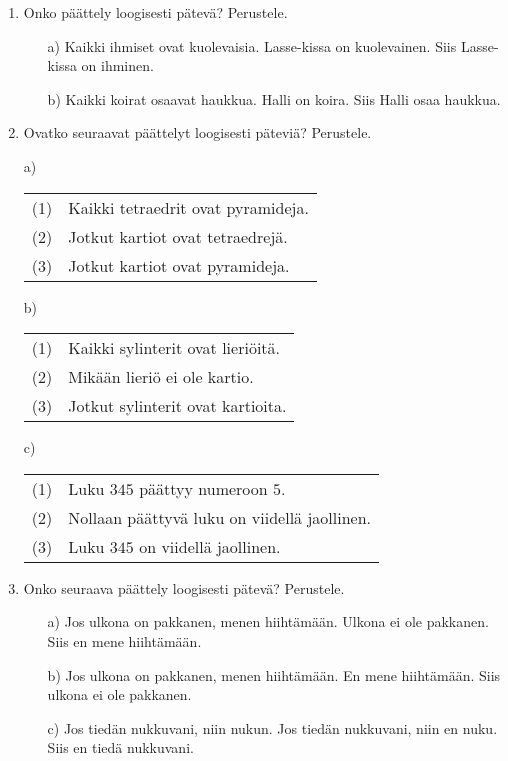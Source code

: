  

\Harjoitustehtavat

\begin{enumerate}

\item Onko päättely loogisesti pätevä? Perustele.
\begin{itemize}
\item[a)]
Kaikki ihmiset ovat kuolevaisia. Lasse-kissa on kuolevainen. Siis Lasse-kissa on ihminen.
\item[b)]
Kaikki koirat osaavat haukkua. Halli on koira. Siis Halli osaa haukkua.
\end{itemize}

\item Ovatko seuraavat päättelyt loogisesti päteviä? Perustele.

a)  
\begin{tabular}{ll}
(1) & Kaikki tetraedrit ovat pyramideja.\\
 (2) & Jotkut kartiot ovat tetraedrejä.\\ \hline                            
 (3) & Jotkut kartiot ovat pyramideja.
\end{tabular}                                

b)  
\begin{tabular}{ll}
(1) & Kaikki sylinterit ovat lieriöitä.\\
 (2) & Mikään lieriö ei ole kartio. \\ \hline                            
 (3) & Jotkut sylinterit ovat kartioita. 
\end{tabular}                                

c)
\begin{tabular}{ll}
(1) & Luku $345$ päättyy numeroon $5$.\\
(2) & Nollaan päättyvä luku on viidellä jaollinen.\\ \hline
(3) & Luku $345$ on viidellä jaollinen.
\end{tabular}


\item Onko seuraava päättely loogisesti pätevä? Perustele.
\begin{itemize}
\item[a)] Jos ulkona on pakkanen, menen hiihtämään. Ulkona ei ole pakkanen. Siis en mene hiihtämään.
\item[b)] Jos ulkona on pakkanen, menen hiihtämään. En mene hiihtämään. Siis ulkona ei ole pakkanen.
\item[c)] Jos tiedän nukkuvani, niin nukun. Jos tiedän nukkuvani, niin en nuku. Siis en tiedä nukkuvani.
\end{itemize}



\end{enumerate}
